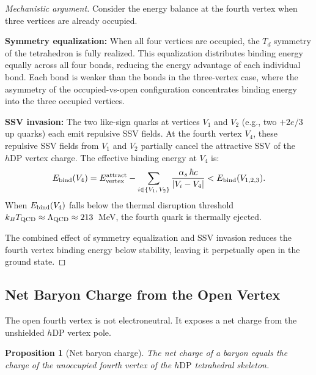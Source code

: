 \documentclass[12pt]{article}
\newtheorem{proposition}[theorem]{Proposition}
\newcommand{\hDP}{h\mathrm{DP}}
\newcommand{\as}{\alpha_s}
\begin{document}
\begin{proof}[Mechanistic argument]
Consider the energy balance at the fourth vertex when three vertices
are already occupied.

\textbf{Symmetry equalization:} When all four vertices are occupied,
the $T_d$ symmetry of the tetrahedron is fully realized.  This
equalization distributes binding energy equally across all four
bonds, reducing the energy advantage of each individual bond.  Each
bond is weaker than the bonds in the three-vertex case, where the
asymmetry of the occupied-vs-open configuration concentrates binding
energy into the three occupied vertices.

\textbf{SSV invasion:} The two like-sign quarks at vertices $V_1$
and $V_2$ (e.g., two $+2e/3$ up quarks) each emit repulsive SSV
fields.  At the fourth vertex $V_4$, these repulsive SSV fields
from $V_1$ and $V_2$ partially cancel the attractive SSV of the
$\hDP$ vertex charge.  The effective binding energy at $V_4$ is:
\begin{equation}
E_{\rm bind}(V_4) = E_{\rm vertex}^{\rm attract}
- \sum_{i \in \{V_1,\, V_2\}} \frac{\as\,\hbar c}{|V_i - V_4|}
< E_{\rm bind}(V_{1,2,3}).
\label{eq:V4_reduced}
\end{equation}
When $E_{\rm bind}(V_4)$ falls below the thermal disruption threshold
$k_B T_{\rm QCD} \approx \Lambda_{\rm QCD} \approx 213$~MeV, the
fourth quark is thermally ejected.

The combined effect of symmetry equalization and SSV invasion reduces
the fourth vertex binding energy below stability, leaving it
perpetually open in the ground state.
\end{proof}

\subsection{Net Baryon Charge from the Open Vertex}

The open fourth vertex is not electroneutral.  It exposes a net
charge from the unshielded $\hDP$ vertex pole.

\begin{proposition}[Net baryon charge]
\label{prop:baryon_charge}
The net charge of a baryon equals the charge of the unoccupied
fourth vertex of the $\hDP$ tetrahedral skeleton.
\end{proposition}
\end{document}
